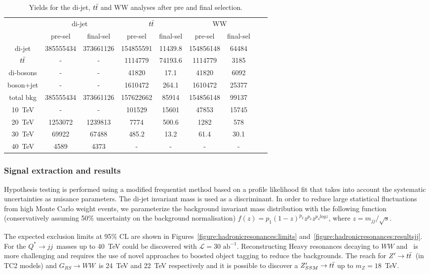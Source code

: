 \documentclass{cernrep}
\newcommand*{\intlumifcc}{\ensuremath{\mathcal{L}=30\text{ ab}^{-1}}}
\newcommand*{\zptt}{\ensuremath{Z^{\prime} \rightarrow \ttbar}}
\newcommand*{\qjj}{\ensuremath{Q^{*} \rightarrow jj}}
\newcommand*{\rsg}{\ensuremath{G_{RS} \rightarrow WW}}
\begin{document}
\begin{table}[htbp]
   \centering
\begin{tabular}{|c|c|c|c|c|c|c|c|c|}
  \hline
  \hline
  & \multicolumn{2}{c|}{di-jet}  & \multicolumn{2}{c|}{$t\bar{t}$} & \multicolumn{2}{c|}{WW} \\
  \cline{2-7}

 & pre-sel & final-sel  & pre-sel & final-sel & pre-sel & final-sel\\
  \hline
  di-jet & 385555434 &  373661126 &  154855591 & 11439.8&  154856148 & 64484\\
  $t\bar{t}$ & - & - & 1114779 & 74193.6 &  1114779 & 3185\\
  di-bosons & - & - &  41820 &  17.1 &  41820 & 6092\\
  boson+jet & - & - & 1610472 & 264.1&  1610472 & 25377\\
  \hline
  total bkg  &  385555434& 373661126& 157622662 & 85914 & 154856148 & 99137\\
  \hline
  10~TeV &  - & - &  101529 & 15601 &  47853 & 15745\\
  20~TeV &   1253072 &  1239813& 7774 & 500.6 & 1282 & 578\\
  30~TeV &  69922 &  67488 & 485.2 & 13.2 &  61.4 & 30.1 \\
  40~TeV &  4589 &  4373 & - & - & - & -\\
  \hline
  \hline
\end{tabular}
  \caption{Yields for the di-jet, $t\bar{t}$ and WW analyses after pre and final selection.}
  \label{tab:hadronicresonances:yields}
\end{table}

\subsubsection{Signal extraction and results}
Hypothesis testing is performed using a modified frequentist method based on a profile likelihood fit that takes into account the systematic uncertainties as nuisance parameters. The di-jet invariant mass is used as a discriminant. In order to reduce large statistical fluctuations from high Monte Carlo weight events, we parameterize the background invariant mass distribution with the following function (conservatively assuming 50\% uncertainty on the background normalisation) $f(z)=p_1(1-z)^{p_2}z^{p_3}z^{p_{4}logz}$, where $z=m_{jj}/\sqrt{s}$.

The expected exclusion limits at 95\% CL are shown in Figures~\ref{figure:hadronicresonances:limits} and~\ref{figure:hadronicresonances:resultsjj}. For the \qjj\ masses up to 40~TeV could be discovered with \intlumifcc. Reconstructing Heavy resonances decaying to $WW$ and \ttbar\ is more challenging and requires the use of novel approaches to boosted object tagging to reduce the backgrounds. The reach for \zptt\ (in TC2 models) and \rsg\ is 24~TeV and 22~TeV respectively and it is possible to discover a $Z^{\prime}_{SSM} \rightarrow t\bar{t}$ up to $m_{Z}=18$~TeV.
\end{document}
